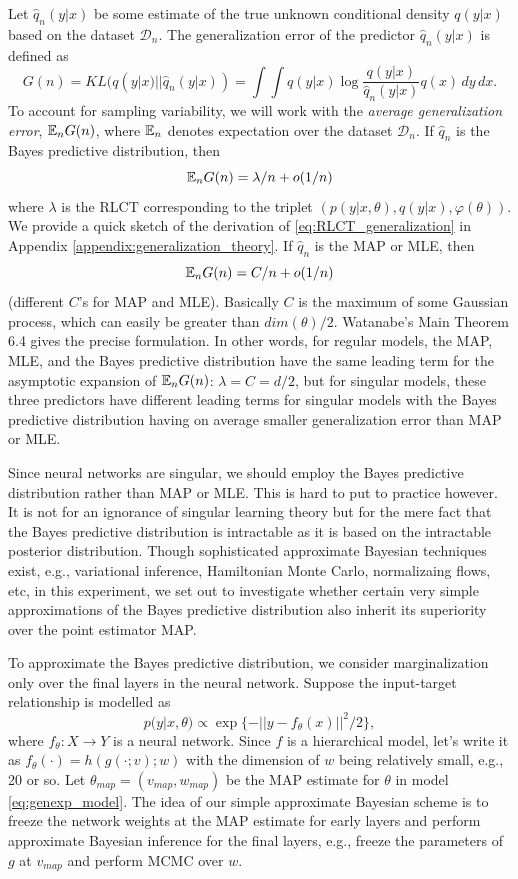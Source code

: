 \documentclass{article} %
\begin{document}
Let $\hat q_n(y|x)$ be some estimate of the true unknown conditional density $q(y|x)$ based on the dataset $\mathcal D_n$. The generalization error of the predictor $\hat q_n(y|x)$ is defined as
$$
G(n) = KL (q(y|x) || \hat q_n(y|x) ) = \int  \int q(y|x) \log \frac{q(y|x)}{\hat q_n(y|x)} q(x) \,dy  \,dx.
$$
To account for sampling variability, we will work with the \textit{average generalization error}, ${\mathbb{E}}_n G(n)$, where ${\mathbb{E}}_n$ denotes expectation over the dataset $\mathcal D_n$.
If $\hat q_n$ is the Bayes predictive distribution, then 
\begin{equation}
{\mathbb{E}}_n G(n) = \lambda/n + o(1/n)
\label{eq:RLCT_generalization}
\end{equation}
where $\lambda$ is the RLCT corresponding to the triplet $( p(y|x,\theta), q(y|x), \varphi(\theta) )$. We provide a quick sketch of the derivation of \eqref{eq:RLCT_generalization} in Appendix \ref{appendix:generalization_theory}.
If $\hat q_n$ is the MAP or MLE, then 
$$
{\mathbb{E}}_n G(n) = C/n + o(1/n)
$$
(different $C$'s for MAP and MLE). Basically $C$ is the maximum of some Gaussian process, which can easily be greater than $dim(\theta)/2$. Watanabe's Main Theorem 6.4 gives the precise formulation. 
In other words, for regular models, the MAP, MLE, and the Bayes predictive distribution have the same leading term for the asymptotic expansion of ${\mathbb{E}}_n G(n)$:  $\lambda = C = d/2$, but for singular models, these three predictors have different leading terms for singular models with the Bayes predictive distribution having on average smaller generalization error than MAP or MLE. 

Since neural networks are singular, we should employ the Bayes predictive distribution rather than MAP or MLE. This is hard to put to practice however. It is not for an ignorance of singular learning theory but for the mere fact that the Bayes predictive distribution is intractable as it is based on the intractable posterior distribution. 
Though sophisticated approximate Bayesian techniques exist, e.g., variational inference, Hamiltonian Monte Carlo, normalizaing flows, etc, in this experiment, we set out to investigate whether certain very simple approximations of the Bayes predictive distribution also inherit its superiority over the point estimator MAP. 

To approximate the Bayes predictive distribution, we consider marginalization only over the final layers in the neural network. Suppose the input-target relationship is modelled as
\begin{equation}
p(y|x,\theta) \propto \exp\{-|| y - f_\theta(x) ||^2/2\},
\label{eq:genexp_model}
\end{equation}
where $f_\theta: X \to Y$ is a neural network. Since $f$ is a hierarchical model, let's write it as $f_\theta(\cdot) = h(g(\cdot;v);w)$ with the dimension of $w$ being relatively small, e.g., 20 or so. Let $\theta_{map} = (v_{map}, w_{map})$ be the MAP estimate for $\theta$ in model \ref{eq:genexp_model}. The idea of our simple approximate Bayesian scheme is to freeze the network weights at the MAP estimate for early layers and perform approximate Bayesian inference for the final layers, e.g., freeze the parameters of $g$ at $v_{map}$ and perform MCMC over $w$. 
\end{document}
